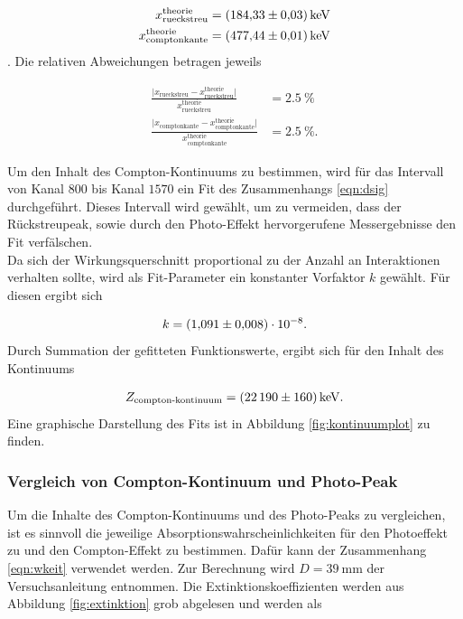 \begin{align*}
  x_\text{rueckstreu}^\text{theorie} = \SI{184.33+-0.03}{\kilo\electronvolt}\\
  x_\text{comptonkante}^\text{theorie} = \SI{477.44+-0.01}{\kilo\electronvolt}
\end{align*}.
Die relativen Abweichungen betragen jeweils

\begin{align*}
  \frac{\lvert x_\text{rueckstreu} - x_\text{rueckstreu}^\text{theorie} \rvert}{x_\text{rueckstreu}^\text{theorie}} &= \SI{2.5}{\percent}\\
  \frac{\lvert x_\text{comptonkante} - x_\text{comptonkante}^\text{theorie} \rvert}{x_\text{comptonkante}^\text{theorie}} &= \SI{2.5}{\percent}.
\end{align*}

Um den Inhalt des Compton-Kontinuums zu bestimmen, wird für das Intervall von Kanal $800$ bis Kanal $1570$ ein
Fit des Zusammenhangs \eqref{eqn:dsig} durchgeführt. Dieses Intervall wird gewählt,
um zu vermeiden, dass der Rückstreupeak, sowie durch den Photo-Effekt hervorgerufene Messergebnisse
den Fit verfälschen.\\ Da sich der Wirkungsquerschnitt proportional zu
der Anzahl an Interaktionen verhalten sollte, wird als Fit-Parameter ein konstanter Vorfaktor $k$ gewählt. Für diesen ergibt
sich

\begin{align*}
  k = \SI{1.091+-0.008 e-8}{}.
\end{align*}
Durch Summation der gefitteten Funktionswerte, ergibt sich für den Inhalt des
Kontinuums

\begin{align*}
  Z_\text{compton-kontinuum} = \SI{22190+-160}{\kilo\electronvolt}.
\end{align*}
Eine graphische Darstellung des Fits ist in Abbildung \ref{fig:kontinuumplot}
zu finden.
\FloatBarrier
\subsubsection{Vergleich von Compton-Kontinuum und Photo-Peak}
\label{subsubsec:a23}
Um die Inhalte des Compton-Kontinuums und des Photo-Peaks zu vergleichen, ist es sinnvoll die jeweilige Absorptionswahrscheinlichkeiten für den Photoeffekt zu
und den Compton-Effekt zu bestimmen. Dafür kann der Zusammenhang \eqref{eqn:wkeit} verwendet werden.
Zur Berechnung wird $D = \SI{39}{\milli\meter}$ der Versuchsanleitung \cite{sample} entnommen.
Die Extinktionskoeffizienten werden aus Abbildung \ref{fig:extinktion} grob abgelesen und werden als

